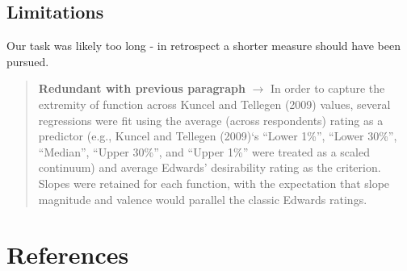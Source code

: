 \documentclass[
  ,jou]{apa6}
\begin{document}
\hypertarget{limitations}{%
\subsection{Limitations}\label{limitations}}

Our task was likely too long - in retrospect a shorter measure should have been pursued.

\begin{quote}
\textbf{Redundant with previous paragraph} \(\rightarrow\) In order to capture the extremity of function across Kuncel and Tellegen (2009) values, several regressions were fit using the average (across respondents) rating as a predictor (e.g., Kuncel and Tellegen (2009)`s ``Lower 1\%'', ``Lower 30\%'', ``Median'', ``Upper 30\%'', and ``Upper 1\%'' were treated as a scaled continuum) and average Edwards' desirability rating as the criterion. Slopes were retained for each function, with the expectation that slope magnitude and valence would parallel the classic Edwards ratings.
\end{quote}

\hypertarget{references}{%
\section{References}\label{references}}

\begingroup
\setlength{\parindent}{-0.5in}
\setlength{\leftskip}{0.5in}
\end{document}
